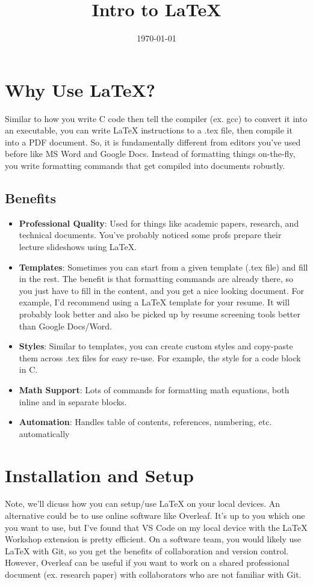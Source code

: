 \documentclass[12pt]{article}
\title{Intro to LaTeX}
\date{\today}
\begin{document}
\maketitle
\tableofcontents
\newpage

\section{Why Use LaTeX?}
Similar to how you write C code then tell the compiler (ex. gcc) to convert it into an executable, you can write LaTeX instructions to a .tex file, then compile it into a PDF document.
So, it is fundamentally different from editors you've used before like MS Word and Google Docs. Instead of formatting things on-the-fly, you write formatting commands that get compiled into documents robustly.

\subsection{Benefits}
\begin{itemize}
  \item \textbf{Professional Quality}: Used for things like academic papers, research, and technical documents. You've probably noticed some profs prepare their lecture slideshows using LaTeX.
  \item \textbf{Templates}: Sometimes you can start from a given template (.tex file) and fill in the rest. The benefit is that formatting commands are already there, so you just have to fill in the content, and you get a nice looking document.
  For example, I'd recommend using a LaTeX template for your resume. It will probably look better and also be picked up by resume screening tools better than Google Docs/Word.
  \item \textbf{Styles}: Similar to templates, you can create custom styles and copy-paste them across .tex files for easy re-use. For example, the style for a code block in C.
  \item \textbf{Math Support}: Lots of commands for formatting math equations, both inline and in separate blocks.
  \item \textbf{Automation}: Handles table of contents, references, numbering, etc. automatically
\end{itemize}

\section{Installation and Setup}
Note, we'll dicuss how you can setup/use LaTeX on your local devices. An alternative could be to use online software like Overleaf. It's up to you which one you want to use, but I've found that VS Code on my local device with the LaTeX Workshop extension is pretty efficient. On a software team, you would likely use LaTeX with Git, so you get the benefits of collaboration and version control. However, Overleaf can be useful if you want to work on a shared professional document (ex. research paper) with collaborators who are not familiar with Git.
\end{document}

